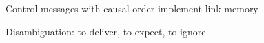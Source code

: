 \documentclass[10pt, xcolor={usenames, dvipsnames}]{beamer}
\begin{document}
\begin{frame}{Control messages with causal order implement link memory}
  
  \begin{adjustwidth}{-1.5em}{-1.5em}

  \begin{minipage}{0.35\textwidth}
    \raggedright
    \vspace{-7pt}
    
  \end{minipage}
  \begin{minipage}{0.36\textwidth}
    \raggedright
    \vspace{-14pt}
    
  \end{minipage}
  \begin{minipage}{0.28\textwidth}
    \raggedright
    
  \end{minipage}

  \begin{minipage}{0.34\textwidth}
    \raggedright
    
  \end{minipage}
  \begin{minipage}{0.34\textwidth}
    \raggedright
    \vspace{9pt}
    
  \end{minipage}
  \hspace{5pt}
  \begin{minipage}{0.31\textwidth}
    \raggedright
    
  \end{minipage}

  \begin{minipage}{0.53\textwidth}
    \raggedleft
    
  \end{minipage}
  \begin{minipage}{0.45\textwidth}
    \centering
            
  \end{minipage}
    

  \end{adjustwidth}

\end{frame}

\begin{frame}{Disambiguation: to deliver, to expect, to ignore}
  
  \begin{adjustwidth}{-1.5em}{-1.5em}
    \begin{center}
    
    \end{center}

    \vspace{2em}

    
  \end{adjustwidth}

\end{frame}
\end{document}
